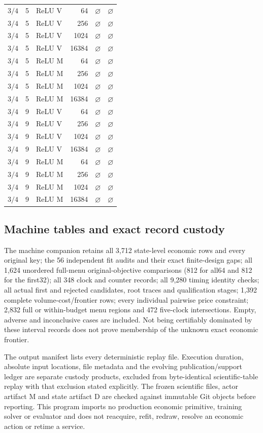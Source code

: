\begin{longtable}{rrlrrr}
$3/4$ & 5 & ReLU V & 64 & $\varnothing$ & $\varnothing$\\
$3/4$ & 5 & ReLU V & 256 & $\varnothing$ & $\varnothing$\\
$3/4$ & 5 & ReLU V & 1024 & $\varnothing$ & $\varnothing$\\
$3/4$ & 5 & ReLU V & 16384 & $\varnothing$ & $\varnothing$\\
$3/4$ & 5 & ReLU M & 64 & $\varnothing$ & $\varnothing$\\
$3/4$ & 5 & ReLU M & 256 & $\varnothing$ & $\varnothing$\\
$3/4$ & 5 & ReLU M & 1024 & $\varnothing$ & $\varnothing$\\
$3/4$ & 5 & ReLU M & 16384 & $\varnothing$ & $\varnothing$\\
$3/4$ & 9 & ReLU V & 64 & $\varnothing$ & $\varnothing$\\
$3/4$ & 9 & ReLU V & 256 & $\varnothing$ & $\varnothing$\\
$3/4$ & 9 & ReLU V & 1024 & $\varnothing$ & $\varnothing$\\
$3/4$ & 9 & ReLU V & 16384 & $\varnothing$ & $\varnothing$\\
$3/4$ & 9 & ReLU M & 64 & $\varnothing$ & $\varnothing$\\
$3/4$ & 9 & ReLU M & 256 & $\varnothing$ & $\varnothing$\\
$3/4$ & 9 & ReLU M & 1024 & $\varnothing$ & $\varnothing$\\
$3/4$ & 9 & ReLU M & 16384 & $\varnothing$ & $\varnothing$\\
\end{longtable}
\endgroup


\subsection{Machine tables and exact record custody}

The machine companion retains all 3,712 state-level economic rows and every original key; the 56 independent fit audits and their exact finite-design gaps; all 1,624 unordered full-menu original-objective comparisons (812 for all64 and 812 for the first32); all 348 clock and counter records; all 9,280 timing identity checks; all actual first and rejected candidates, root traces and qualification stages; 1,392 complete volume-cost/frontier rows; every individual pairwise price constraint; 2,832 full or within-budget menu regions and 472 five-clock intersections. Empty, adverse and inconclusive cases are included. Not being certifiably dominated by these interval records does not prove membership of the unknown exact economic frontier.

The output manifest lists every deterministic replay file. Execution duration, absolute input locations, file metadata and the evolving publication/support ledger are separate custody products, excluded from byte-identical scientific-table replay with that exclusion stated explicitly. The frozen scientific files, actor artifact M and state artifact D are checked against immutable Git objects before reporting. This program imports no production economic primitive, training solver or evaluator and does not reacquire, refit, redraw, resolve an economic action or retime a service.
